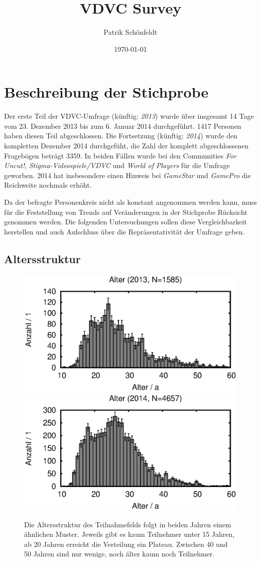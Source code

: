 \documentclass[11pt]{scrartcl}
\title{VDVC Survey}
\author{Patrik Schönfeldt}
\date{\today}
\begin{document}
\maketitle

\section{Beschreibung der Stichprobe}
Der erste Teil der VDVC-Umfrage (künftig: \emph{2013}) wurde über insgesamt 14 Tage
vom 23. Dezember 2013 bis zum 6. Januar 2014 durchgeführt.
1417 Personen haben diesen Teil abgeschlossen.
Die Fortsetzung (künftig: \emph{2014}) wurde
den kompletten Dezember 2014 durchgefüht,
die Zahl der komplett abgeschlossenen Fragebögen beträgt 3359.
In beiden Fällen wurde bei den Communities \emph{For Uncut!},
\emph{Stigma-Videospiele/VDVC} und \emph{World of Players} für die Umfrage
geworben.
2014 hat insbesondere einen Hinweis bei \emph{GameStar} und \emph{GamePro}
die Reichweite nochmals erhöht.

Da der befragte Personenkreis nicht als konstant angenommen werden kann,
muss für die Feststellung von Trends auf Veränderungen in der Stichprobe
Rücksicht genommen werden.
Die folgenden Untersuchungen sollen diese Vergleichbarkeit herstellen
und auch Aufschluss über die Repräsentativität der Umfrage geben.

\subsection{Altersstruktur}

\begin{figure}[htbp]
	\centering
	\includegraphics[width=0.48\linewidth]{2013/alter}\hfill
	\includegraphics[width=0.48\linewidth]{2014/alter}
	\caption[Altersstruktur]
	{Die Altersstruktur des Teilnahmefelds folgt in beiden Jahren einem
	ähnlichen Muster.
	Jeweils gibt es kaum Teilnehmer unter 15 Jahren,
	ab 20 Jahren erreicht die Verteilung ein Plateau.
	Zwischen 40 und 50 Jahren sind nur wenige,
	noch älter kaum noch Teilnehmer.}
	\label{fig:alter}
\end{figure}
\end{document}
